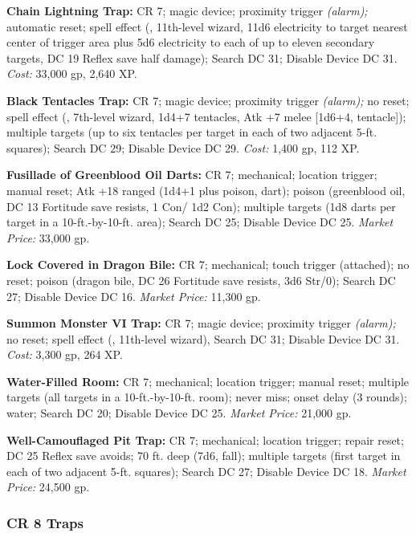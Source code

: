 \textbf{Chain Lightning Trap:} CR 7; magic device; proximity 
trigger \textit{(alarm); }automatic reset; spell effect (, 
11th-level wizard, 11d6 electricity to target nearest center of trigger area plus 
5d6 electricity to each of up to eleven secondary targets, DC 19 Reflex save half 
damage); Search DC 31; Disable Device DC 31. \textit{Cost:} 33,000 gp, 2,640 XP. 

\textbf{Black Tentacles Trap:} CR 7; magic device; proximity 
trigger \textit{(alarm); }no reset; spell effect (, 7th-level 
wizard, 1d4+7 tentacles, Atk +7 melee [1d6+4, tentacle]); multiple targets (up 
to six tentacles per target in each of two adjacent 5-ft. squares); Search DC 29; 
Disable Device DC 29. \textit{Cost:} 1,400 gp, 112 XP.

\textbf{Fusillade of Greenblood Oil Darts:} CR 7; mechanical; location trigger; 
manual reset; Atk +18 ranged (1d4+1 plus poison, dart); poison (greenblood oil, 
DC 13 Fortitude save resists, 1 Con/ 1d2 Con); multiple targets (1d8 darts per 
target in a 10-ft.-by-10-ft. area); Search DC 25; Disable Device DC 25. \textit{Market 
Price:} 33,000 gp.

\textbf{Lock Covered in Dragon Bile:} CR 7; mechanical; touch trigger (attached); 
no reset; poison (dragon bile, DC 26 Fortitude save resists, 3d6 Str/0); Search 
DC 27; Disable Device DC 16. \textit{Market Price:} 11,300 gp.

\textbf{Summon Monster VI Trap:} CR 7; magic device; proximity 
trigger \textit{(alarm); }no reset; spell effect (, 11th-level 
wizard), Search DC 31; Disable Device DC 31. \textit{Cost:} 3,300 gp, 264 XP.

\textbf{Water-Filled Room:} CR 7; mechanical; location trigger; manual reset; multiple 
targets (all targets in a 10-ft.-by-10-ft. room); never miss; onset delay (3 rounds); 
water; Search DC 20; Disable Device DC 25. \textit{Market Price:} 21,000 gp. 

\textbf{Well-Camouflaged Pit Trap:} CR 7; mechanical; location trigger; repair 
reset; DC 25 Reflex save avoids; 70 ft. deep (7d6, fall); multiple targets (first 
target in each of two adjacent 5-ft. squares); Search DC 27; Disable Device DC 
18. \textit{Market Price:} 24,500 gp. 

\subsubsection{CR 8 Traps}

